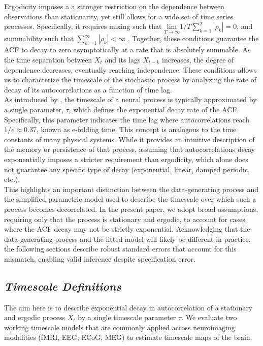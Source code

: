 \documentclass[main.tex]{subfiles}
\begin{document}
Ergodicity imposes a a stronger restriction on the dependence between observations than stationarity, yet still allows for a wide set of time series processes. Specifically, it requires mixing such that $\underset{T\to\infty}{\text{lim}} 1/T \sum_{k=1}^T |\rho_k| = 0$, and summability such that $\sum_{k=1}^\infty |\rho_k| < \infty$ \citep[chapter~14.7]{hansen_econometrics_2022}. Together, these conditions guarantee the ACF to decay to zero asymptotically at a rate that is absolutely summable. As the time separation between $X_t$ and its lags $X_{t-k}$ increases, the degree of dependence decreases, eventually reaching independence. These conditions allows us to characterize the timescale of the stochastic process by analyzing the rate of decay of its autocorrelations as a function of time lag.\\

As introduced by \citet{murray_hierarchy_2014}, the timescale of a neural process is typically approximated by a single parameter, $\tau$, which defines the exponential decay rate of the ACF. Specifically, this parameter indicates the time lag where autocorrelations reach $1/e \approx 0.37$, known as e-folding time. This concept is analogous to the time constants of many physical systems. While it provides an intuitive description of the memory or persistence of that process, assuming that autocorrelations decay exponentially imposes a stricter requirement than ergodicity, which alone does not guarantee any specific type of decay (exponential, linear, damped periodic, etc.). \\

This highlights an important distinction between the data-generating process and the simplified parametric model used to describe the timescale over which such a process becomes decorrelated. In the present paper, we adopt broad assumptions, requiring only that the process is stationary and ergodic, to account for cases where the ACF decay may not be strictly exponential. Acknowledging that the data-generating process and the fitted model will likely be different in practice, the following sections describe robust standard errors that account for this mismatch, enabling valid inference despite specification error.

\subsection{\textit{Timescale Definitions}}
The aim here is to describe exponential decay in autocorrelation of a stationary and ergodic process $X_t$ by a single timescale parameter $\tau$. We evaluate two working timescale models that are commonly applied across neuroimaging modalities (fMRI, EEG, ECoG, MEG) to estimate timescale maps of the brain. 
\end{document}
